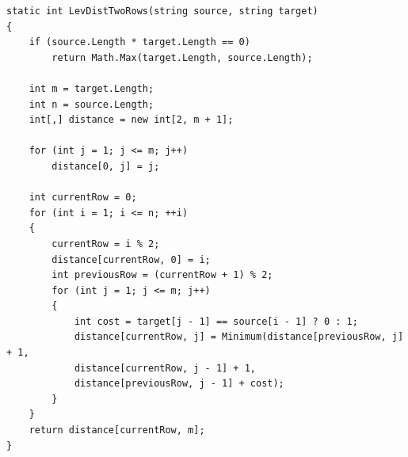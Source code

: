 \documentclass{report}
\begin{document}
\newpage
\begin{lstlisting}[label=code3,caption=Функция для нерекурсивного нахождения расстояния Левенштейна с кэшем в виде двух строк матрицы]
static int LevDistTwoRows(string source, string target)
{
	if (source.Length * target.Length == 0)
		return Math.Max(target.Length, source.Length);
	
	int m = target.Length;
	int n = source.Length;
	int[,] distance = new int[2, m + 1];
	
	for (int j = 1; j <= m; j++) 
		distance[0, j] = j;
	
	int currentRow = 0;
	for (int i = 1; i <= n; ++i)
	{
		currentRow = i % 2;
		distance[currentRow, 0] = i;
		int previousRow = (currentRow + 1) % 2;
		for (int j = 1; j <= m; j++)
		{
			int cost = target[j - 1] == source[i - 1] ? 0 : 1;
			distance[currentRow, j] = Minimum(distance[previousRow, j] + 1,
			distance[currentRow, j - 1] + 1,
			distance[previousRow, j - 1] + cost);
		}
	}
	return distance[currentRow, m];
}	
\end{lstlisting}
\end{document}
